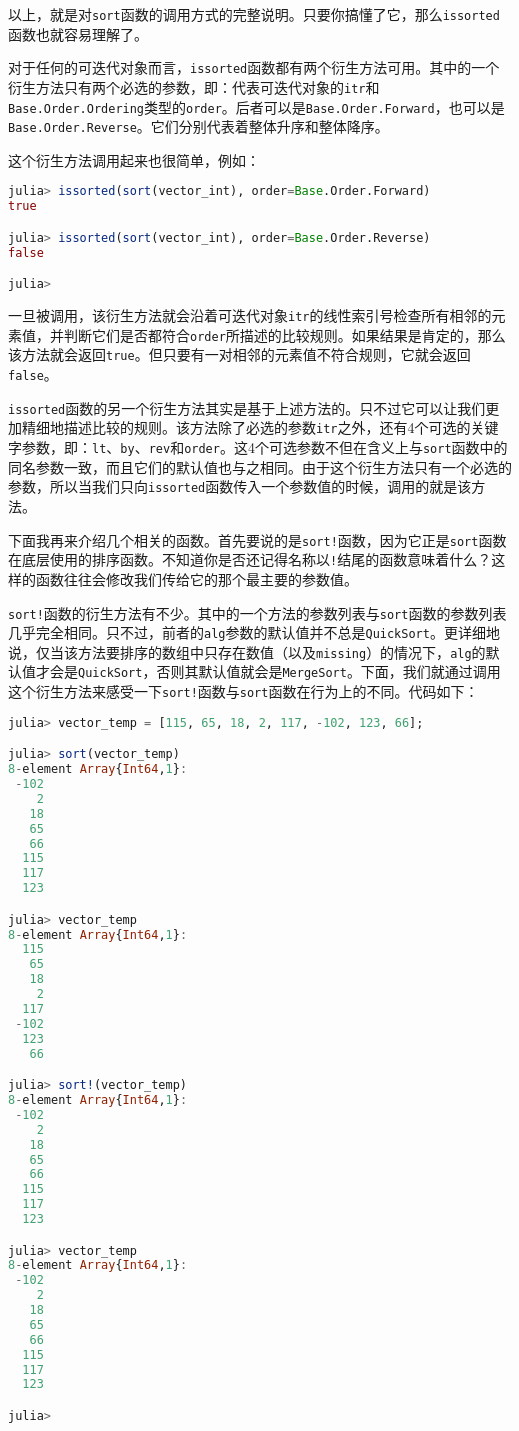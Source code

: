 以上，就是对\verb|sort|函数的调用方式的完整说明。只要你搞懂了它，那么\verb|issorted|函数也就容易理解了。

对于任何的可迭代对象而言，\verb|issorted|函数都有两个衍生方法可用。其中的一个衍生方法只有两个必选的参数，即：代表可迭代对象的\verb|itr|和\verb|Base.Order.Ordering|类型的\verb|order|。后者可以是\verb|Base.Order.Forward|，也可以是\verb|Base.Order.Reverse|。它们分别代表着整体升序和整体降序。

这个衍生方法调用起来也很简单，例如：

\begin{lstlisting}[language=julia]
julia> issorted(sort(vector_int), order=Base.Order.Forward)
true

julia> issorted(sort(vector_int), order=Base.Order.Reverse)
false

julia> 
\end{lstlisting}

一旦被调用，该衍生方法就会沿着可迭代对象\verb|itr|的线性索引号检查所有相邻的元素值，并判断它们是否都符合\verb|order|所描述的比较规则。如果结果是肯定的，那么该方法就会返回\verb|true|。但只要有一对相邻的元素值不符合规则，它就会返回\verb|false|。

\verb|issorted|函数的另一个衍生方法其实是基于上述方法的。只不过它可以让我们更加精细地描述比较的规则。该方法除了必选的参数\verb|itr|之外，还有4个可选的关键字参数，即：\verb|lt|、\verb|by|、\verb|rev|和\verb|order|。这4个可选参数不但在含义上与\verb|sort|函数中的同名参数一致，而且它们的默认值也与之相同。由于这个衍生方法只有一个必选的参数，所以当我们只向\verb|issorted|函数传入一个参数值的时候，调用的就是该方法。

下面我再来介绍几个相关的函数。首先要说的是\verb|sort!|函数，因为它正是\verb|sort|函数在底层使用的排序函数。不知道你是否还记得名称以\verb|!|结尾的函数意味着什么？这样的函数往往会修改我们传给它的那个最主要的参数值。

\verb|sort!|函数的衍生方法有不少。其中的一个方法的参数列表与\verb|sort|函数的参数列表几乎完全相同。只不过，前者的\verb|alg|参数的默认值并不总是\verb|QuickSort|。更详细地说，仅当该方法要排序的数组中只存在数值（以及\verb|missing|）的情况下，\verb|alg|的默认值才会是\verb|QuickSort|，否则其默认值就会是\verb|MergeSort|。下面，我们就通过调用这个衍生方法来感受一下\verb|sort!|函数与\verb|sort|函数在行为上的不同。代码如下：

\begin{lstlisting}[language=julia]
julia> vector_temp = [115, 65, 18, 2, 117, -102, 123, 66];

julia> sort(vector_temp)
8-element Array{Int64,1}:
 -102
    2
   18
   65
   66
  115
  117
  123

julia> vector_temp
8-element Array{Int64,1}:
  115
   65
   18
    2
  117
 -102
  123
   66

julia> sort!(vector_temp)
8-element Array{Int64,1}:
 -102
    2
   18
   65
   66
  115
  117
  123

julia> vector_temp
8-element Array{Int64,1}:
 -102
    2
   18
   65
   66
  115
  117
  123

julia> 
\end{lstlisting}

